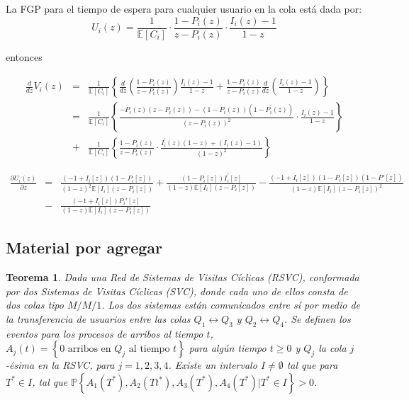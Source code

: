 \documentclass{article}
\newtheorem{Teo}{Teorema}
\newcommand{\esp}{\mathbb{E}}
\newcommand{\prob}{\mathbb{P}}
\begin{document}
La FGP para el tiempo de espera para cualquier usuario en la cola est\'a dada por:
\[U_{i}\left(z\right)=\frac{1}{\esp\left[C_{i}\right]}\cdot\frac{1-P_{i}\left(z\right)}{z-P_{i}\left(z\right)}\cdot\frac{I_{i}\left(z\right)-1}{1-z}\]

entonces


\begin{eqnarray*}
\frac{d}{dz}V_{i}\left(z\right)&=&\frac{1}{\esp\left[C_{i}\right]}\left\{\frac{d}{dz}\left(\frac{1-P_{i}\left(z\right)}{z-P_{i}\left(z\right)}\right)\frac{I_{i}\left(z\right)-1}{1-z}+\frac{1-P_{i}\left(z\right)}{z-P_{i}\left(z\right)}\frac{d}{dz}\left(\frac{I_{i}\left(z\right)-1}{1-z}\right)\right\}\\
&=&\frac{1}{\esp\left[C_{i}\right]}\left\{\frac{-P_{i}\left(z\right)\left(z-P_{i}\left(z\right)\right)-\left(1-P_{i}\left(z\right)\right)\left(1-P_{i}^{'}\left(z\right)\right)}{\left(z-P_{i}\left(z\right)\right)^{2}}\cdot\frac{I_{i}\left(z\right)-1}{1-z}\right\}\\
&+&\frac{1}{\esp\left[C_{i}\right]}\left\{\frac{1-P_{i}\left(z\right)}{z-P_{i}\left(z\right)}\cdot\frac{I_{i}^{'}\left(z\right)\left(1-z\right)+\left(I_{i}\left(z\right)-1\right)}{\left(1-z\right)^{2}}\right\}
\end{eqnarray*}


\begin{eqnarray*}
\frac{\partial U_{i}\left(z\right)}{\partial z}&=&\frac{(-1+I_{i}[z]) (1-P_{i}[z])}{(1-z)^2 \esp[I_{i}] (z-P_{i}[z])}+\frac{(1-P_{i}[z]) I_{i}^{'}[z]}{(1-z) \esp[I_{i}] (z-P_{i}[z])}-\frac{(-1+I_{i}[z]) (1-P_{i}[z])\left(1-P{'}[z]\right)}{(1-z) \esp[I_{i}] (z-P_{i}[z])^2}\\
&-&\frac{(-1+I_{i}[z]) P_{i}{'}[z]}{(1-z) \esp[I_{i}](z-P_{i}[z])}
\end{eqnarray*}


\subsection{Material por agregar}


\begin{Teo}
Dada una Red de Sistemas de Visitas C\'iclicas (RSVC), conformada por dos Sistemas de Visitas C\'iclicas (SVC), donde cada uno de ellos consta de dos colas tipo $M/M/1$. Los dos sistemas est\'an comunicados entre s\'i por medio de la transferencia de usuarios entre las colas $Q_{1}\leftrightarrow Q_{3}$ y $Q_{2}\leftrightarrow Q_{4}$. Se definen los eventos para los procesos de arribos al tiempo $t$, $A_{j}\left(t\right)=\left\{0 \textrm{ arribos en }Q_{j}\textrm{ al tiempo }t\right\}$ para alg\'un tiempo $t\geq0$ y $Q_{j}$ la cola $j$-\'esima en la RSVC, para $j=1,2,3,4$.  Existe un intervalo $I\neq\emptyset$ tal que para $T^{*}\in I$, tal que $\prob\left\{A_{1}\left(T^{*}\right),A_{2}\left(Tt^{*}\right),
A_{3}\left(T^{*}\right),A_{4}\left(T^{*}\right)|T^{*}\in I\right\}>0$.
\end{Teo}
\end{document}
